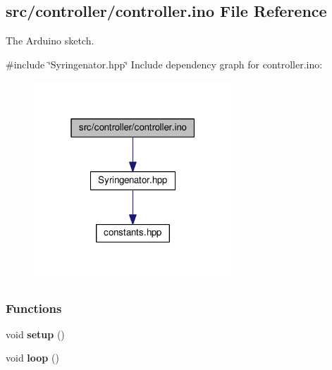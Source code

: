 \hypertarget{controller_8ino}{}\subsection{src/controller/controller.ino File Reference}
\label{controller_8ino}


The Arduino sketch.  


{\ttfamily \#include \char`\"{}Syringenator.\+hpp\char`\"{}}\newline
Include dependency graph for controller.\+ino\+:
\nopagebreak
\begin{figure}[H]
\begin{center}
\leavevmode
\includegraphics[width=211pt]{controller_8ino__incl}
\end{center}
\end{figure}
\subsubsection*{Functions}
\begin{DoxyCompactItemize}
\item 
\mbox{\label{controller_8ino_a4fc01d736fe50cf5b977f755b675f11d}} 
void {\bfseries setup} ()
\item 
\mbox{\label{controller_8ino_afe461d27b9c48d5921c00d521181f12f}} 
void {\bfseries loop} ()
\end{DoxyCompactItemize}
